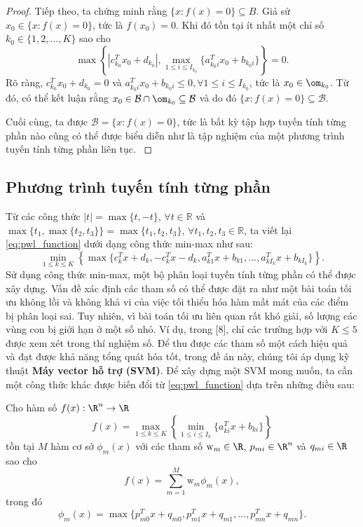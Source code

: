 \begin{proof}
    Tiếp theo, ta chứng minh rằng \( \{ x : f(x) = 0 \} \subseteq B \). Giả sử \( x_0 \in \{ x : f(x) = 0 \} \),
    tức là \( f(x_0) = 0 \). Khi đó tồn tại ít nhất một chỉ số \( k_0 \in \{ 1, 2, \ldots, K \} \) sao cho
    \[
    \max \left\{ |c_{k_0}^T x_0 + d_{k_0}|, \max_{1 \leq i \leq I_{k_0}} \{ a_{k_0i}^T x_0 + b_{k_0i} \} \right\} = 0.
    \]
    Rõ ràng, \( c_{k_0}^T x_0 + d_{k_0} = 0 \) và \( a_{k_0i}^T x_0 + b_{k_0i} \leq 0, \forall 1 \leq i \leq I_{k_0} \), tức là \( x_0 \in \om_{k_0} \).
    Từ đó, có thể kết luận rằng \( x_0 \in \mathcal{B} \cap \om_{k_0} \subseteq \mathcal{B} \) và do đó
    \( \{ x : f(x) = 0 \} \subseteq \mathcal{B} \).

    Cuối cùng, ta được \( \mathcal{B} = \{ x : f(x) = 0 \} \), tức là bất kỳ tập hợp tuyến tính từng phần nào cũng có thể được biểu diễn như là tập nghiệm của một phương trình tuyến tính từng phần liên tục.
    \label{thm:pwl_set}
\end{proof}

\subsection{Phương trình tuyến tính từng phần}
Từ các công thức \sloppy \( |t| = \max\{t, -t\}\), \( \forall t \in \mathbb{R} \) và \( \max\{t_1, \max\{t_2, t_3\}\} = \max\{t_1, t_2, t_3\}\), \( \forall t_1, t_2, t_3 \in \mathbb{R} \), ta viết lại \eqref{eq:pwl_function} dưới dạng công thức min-max như sau:
\[
\min_{1 \leq k \leq K} \left\{ \max \{ c_k^T x + d_k, -c_k^T x - d_k, a_{k1}^T x + b_{k1}, \ldots, a_{kI_k}^T x + b_{kI_k} \} \right\}.
\]
Sử dụng công thức min-max, một bộ phân loại tuyến tính từng phần có thể được xây dựng. Vấn đề xác định các tham số có thể được đặt ra như một bài toán tối ưu không lồi và không khả vi của việc tối thiểu hóa hàm mất mát của các điểm bị phân loại sai. Tuy nhiên, vì bài toán tối ưu liên quan rất khó giải, số lượng các vùng con bị giới hạn ở một số nhỏ. Ví dụ, trong [8], chỉ các trường hợp với \( K \leq 5 \) được xem xét trong thí nghiệm số.
Để thu được các tham số một cách hiệu quả và đạt được khả năng tổng quát hóa tốt, trong đề án này, chúng tôi áp dụng kỹ thuật \textbf{Máy vector hỗ trợ (SVM)}. Để xây dựng một SVM mong muốn, ta cần một công thức khác được biến đổi từ \eqref{eq:pwl_function} dựa trên những điều sau:

\begin{lemma}
    Cho hàm số \( f(x): \R^n \to \R \)
    \[
    f(x) = \max_{1 \leq k \leq K} \left\{ \min_{1 \leq i \leq I_k} \{ a_{ki}^T x + b_{ki} \} \right\}
    \]
    tồn tại \(M\) hàm cơ sở \( \phi_m(x) \) với các tham số \(\text{w}_m \in \R\), \(p_{mi} \in \R^n\) và \( q_{mi} \in \R \) sao cho
    \[
    f(x) = \displaystyle{\sum_{m=1}^{M}} \text{w}_m \phi_m(x),
    \]
    trong đó
    \[
    \phi_m(x) = \max \{ p_{m0}^T x + q_{m0}, p_{m1}^T x + q_{m1}, \ldots , p_{mn}^T x + q_{mn}\}.
    \]
    \label{lemma:wang_and_sun}
\end{lemma}

